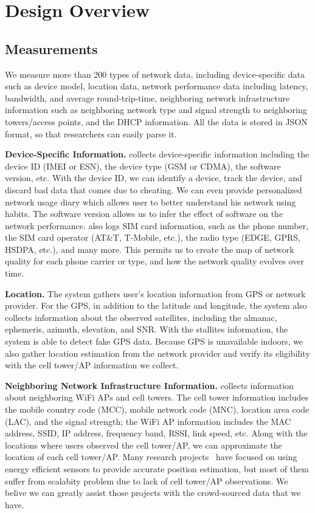 \section{Design Overview}
\label{s:overview}

\subsection{Measurements}
We measure more than 200 types of network data, including device-specific data such as device model, 
location data, network performance data including latency, bandwidth, and average round-trip-time, 
neighboring network infrastructure information such as neighboring network type and signal strength to 
neighboring towers/access points, and the DHCP information. All the data is stored in JSON format, so
that researchers can easily parse it.


{\bfseries Device-Specific Information.} \name{} collects device-specific information including the device ID 
(IMEI or ESN), the device type (GSM or CDMA), the software version, etc. With the device ID, we can 
identify a device, track the device, and discard bad data that comes due to cheating. We can 
even provide personalized network usage diary which allows user to better understand his network 
using habits.
The software version allows us to infer the effect of software on the network performance. \name{} also 
logs SIM card information, such as the phone number, the SIM card operator (AT\&T, T-Mobile, etc.),
the radio type (EDGE, GPRS, HSDPA, etc.), and many more.
This permits us to create the map of network quality for each phone carrier or type, and how the network quality 
evolves over time.

{\bfseries Location.} The system gathers user's location information from GPS or network provider. 
For the GPS, in addition to the latitude and longitude, the system also collects information 
about the observed satellites, including the almanac, ephemeris, azimuth, elevation, and SNR.
With the stallites information, the system is able to detect fake GPS data.
Because GPS is unavailable indoors, we also gather location estimation from the network provider
and verify its eligibility with the cell tower/AP information we collect.


{\bfseries Neighboring Network Infrastructure Information.} \name{} collects information about
neighboring WiFi APs and cell towers. The cell tower information includes the mobile country code (MCC), 
mobile network code (MNC), location area code (LAC), and the signal strength; the WiFi AP information
includes the MAC address, SSID, IP address, frequency band, RSSI, link speed, etc.
Along with the locations where users observed the cell tower/AP, we can approximate the location of 
each cell tower/AP. Many research projects~\cite{ctrack, vtrack-sensys09} have focused on using 
energy efficient sensors to provide accurate position estimation, but most of them suffer from scalabity
problem due to lack of cell tower/AP observations. We belive we can greatly assist those projects
with the crowd-sourced data that we have. 

